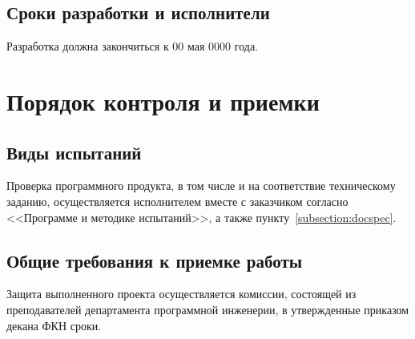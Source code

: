 \documentclass[techtask]{espd}
\begin{document}
\subsection{Сроки разработки и исполнители}
Разработка должна закончиться к 00 мая 0000 года.

\section{Порядок контроля и приемки}
\subsection{Виды испытаний}
Проверка программного продукта, в том числе и на соответствие техническому заданию, осуществляется исполнителем вместе с заказчиком согласно <<Программе и методике испытаний>>, а также пункту~\ref{subsection:docspec}.

\subsection{Общие требования к приемке работы}
Защита выполненного проекта осуществляется комиссии, состоящей из преподавателей департамента программной инженерии, в утвержденные приказом декана ФКН сроки.


\end{document}
